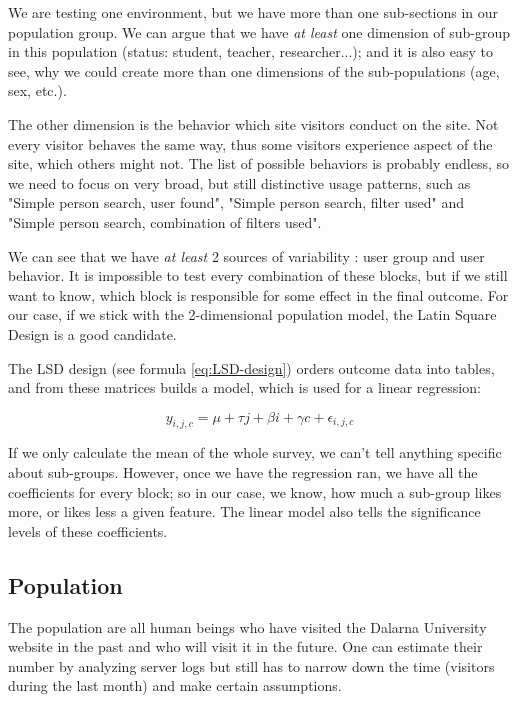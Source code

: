 \documentclass[12pt,a4paper,paper=a4,oneside,titlepage,pdftex]{scrartcl}
\begin{document}
We are testing one environment, but we have more than one sub-sections in our population group. We can argue that we have \textit{at least} one dimension of sub-group in this population (status: student, teacher, researcher...); and it is also easy to see, why we could create more than one dimensions of the sub-populations (age, sex, etc.).

The other dimension is the behavior which site visitors conduct on the site. Not every visitor behaves the same way, thus some visitors experience aspect of the site, which others might not. The list of possible behaviors is probably endless, so we need to focus on very broad, but still distinctive usage patterns, such as "Simple person search, user found", "Simple person search, filter used" and "Simple person search, combination of filters used".

We can see that we have \textit{at least }2 sources of variability : user group and user behavior. It is impossible to test every combination of these blocks, but if we still want to know, which block is responsible for some effect in the final outcome. For our case, if we stick with the 2-dimensional population model, the Latin Square Design is a good candidate.

The LSD design (see formula \ref{eq:LSD-design}) orders outcome data into tables, and from these matrices builds a model, which is used for a linear regression:

\begin{equation}
y_{i,j,c} = \mu + \tau j + \beta i + \gamma c + \epsilon_{i,j,c}
\label{eq:LSD-design}
\end{equation}

If we only calculate the mean of the whole survey, we can't tell anything specific about sub-groups. However, once we have the regression ran, we have all the coefficients for every block; so in our case, we know, how much a sub-group likes more, or likes less a given feature. The linear model also tells the significance levels of these coefficients.

\subsection{Population}
The population are all human beings who have visited the Dalarna University website in the past and who will visit it in the future. One can estimate their number by analyzing server logs but still has to narrow down the time (visitors during the last month) and make certain assumptions.
\end{document}
